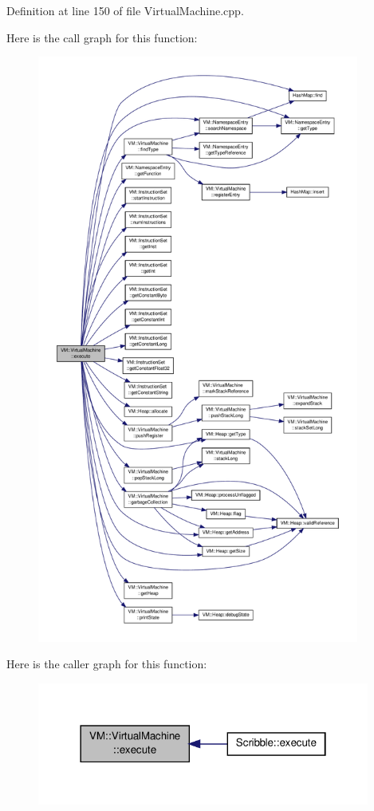 Definition at line 150 of file Virtual\-Machine.\-cpp.



Here is the call graph for this function\-:
\nopagebreak
\begin{figure}[H]
\begin{center}
\leavevmode
\includegraphics[height=550pt]{class_v_m_1_1_virtual_machine_addc13d6dc68198f867b7ff8e21746af7_cgraph}
\end{center}
\end{figure}




Here is the caller graph for this function\-:
\nopagebreak
\begin{figure}[H]
\begin{center}
\leavevmode
\includegraphics[width=310pt]{class_v_m_1_1_virtual_machine_addc13d6dc68198f867b7ff8e21746af7_icgraph}
\end{center}
\end{figure}


